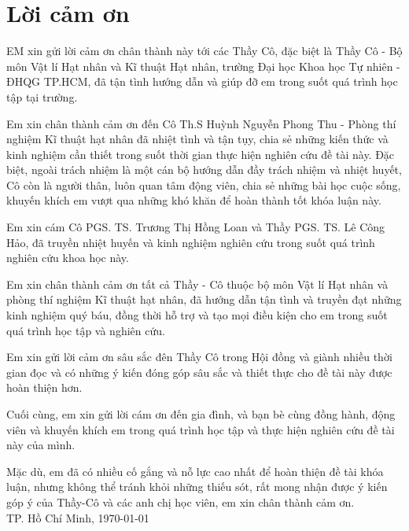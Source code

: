 \chapter*{Lời cảm ơn}

EM xin gửi lời cảm ơn chân thành này tới các Thầy Cô, đặc biệt là Thầy Cô - Bộ môn Vật lí Hạt nhân và Kĩ thuật Hạt nhân, trường Đại học Khoa học Tự nhiên - ĐHQG TP.HCM, đã tận tình hướng dẫn và giúp đỡ em trong suốt quá trình học tập tại trường.

Em xin chân thành cảm ơn đến Cô Th.S Huỳnh Nguyễn Phong Thu - Phòng thí nghiệm Kĩ thuật hạt nhân đã nhiệt tình và tận tụy, chia sẻ những kiến thức và kinh nghiệm cần thiết trong suốt thời gian thực hiện nghiên cứu đề tài này. Đặc biệt, ngoài trách nhiệm là một cán bộ hướng dẫn đầy trách nhiệm và nhiệt huyết, Cô còn là người thân, luôn quan tâm động viên, chia sẻ những bài học cuộc sống, khuyến khích em vượt qua những khó khăn để hoàn thành tốt khóa luận này. 

Em xin cám Cô PGS. TS. Trương Thị Hồng Loan và Thầy PGS. TS. Lê Công Hảo, đã truyền nhiệt huyến và kinh nghiệm nghiên cứu trong suốt quá trình nghiên cứu khoa học này.

Em xin chân thành cảm ơn tất cả Thầy - Cô  thuộc bộ môn Vật lí Hạt nhân và phòng thí nghiệm Kĩ thuật hạt nhân, đã hướng dẫn tận tình và truyền đạt những kinh nghiệm quý báu, đồng thời hỗ trợ và tạo mọi điều kiện cho em trong suốt quá trình học tập và nghiên cứu. 

Em xin gửi lời cảm ơn sâu sắc đên Thầy Cô trong Hội đồng và giành nhiều thời gian đọc và có những ý kiến đóng góp sâu sắc và thiết thực cho đề tài này được hoàn thiện hơn.

Cuối cùng, em xin gửi lời cám ơn đến gia đình, và bạn bè cùng đồng hành, động viên và khuyến khích em trong quá trình học tập và thực hiện nghiên cứu đề tài này của mình.

Mặc dù, em đã có nhiều cố gắng và nỗ lực cao nhất để hoàn thiện đề tài khóa luận, nhưng không thể tránh khỏi những thiếu sót, rất mong nhận được ý kiến góp ý của Thầy-Cô và các anh chị học viên, em xin chân thành cảm ơn.\\

\hspace*{\fill} TP. Hồ Chí Minh, \today
